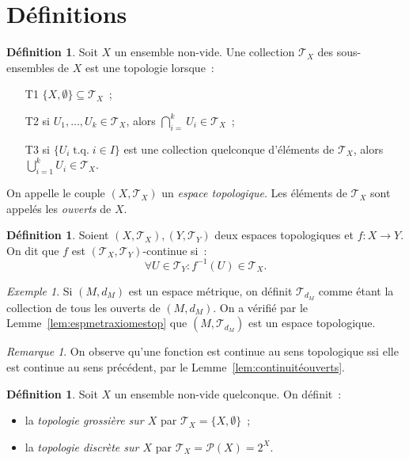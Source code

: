 \documentclass{report}
\theoremstyle{definition}
\newtheorem{déf}[thm]{Définition}
\theoremstyle{remark}
\newtheorem*{rmq}{Remarque}
\newtheorem{ex}{Exemple}[section]
\DeclareMathOperator{\tq}{\text{ t.q. }}
\renewcommand{\top}{\mathcal T}
\begin{document}
	\section{Définitions}
		\begin{déf} Soit $X$ un ensemble non-vide. Une collection $\top_X$ des sous-ensembles de $X$ est une topologie lorsque~:
		\begin{itemize}
			\item[T1] $\{X, \emptyset\} \subseteq \top_X$~;
			\item[T2] si $U_1, \ldots, U_k \in \top_X$, alors $\bigcap_{i=}^kU_i \in \top_X$~;
			\item[T3] si $\{U_i \tq i \in I\}$ est une collection quelconque d'éléments de $\top_X$, alors $\bigcup_{i=1}^kU_i \in \top_X$.
		\end{itemize}

		On appelle le couple $(X, \top_X)$ un \textit{espace topologique}. Les éléments de $\top_X$ sont appelés les \textit{ouverts} de $X$.
		\end{déf}

		\begin{déf} Soient $(X, \top_X), (Y, \top_Y)$ deux espaces topologiques et $f : X \to Y$. On dit que $f$ est $(\top_X, \top_Y)$-continue si~:
		\[\forall U \in \top_Y : f^{-1}(U) \in \top_X.\]
		\end{déf}

		\begin{ex} Si $(M, d_M)$ est un espace métrique, on définit $\top_{d_M}$ comme étant la collection de tous les ouverts de $(M, d_M)$. On a vérifié par
		le Lemme~\ref{lem:espmetraxiomestop} que $(M, \top_{d_M})$ est un espace topologique.
		\end{ex}

		\begin{rmq} On observe qu'une fonction est continue au sens topologique ssi elle est continue au sens précédent, par le Lemme~\ref{lem:continuitéouverts}.
		\end{rmq}

		\begin{déf} Soit $X$ un ensemble non-vide quelconque. On définit~:
		\begin{itemize}
			\item la \textit{topologie grossière sur $X$} par $\top_X = \{X, \emptyset\}$~;
			\item la \textit{topologie discrète sur $X$} par $\top_X = \mathcal P(X) = 2^X$.
		\end{itemize}
		\end{déf}
\end{document}
